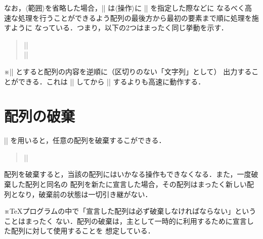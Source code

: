 \documentclass[a4paper,uplatex]{jsarticle}
\newcommand{\Meta}[1]{$\langle$\mbox{}#1\mbox{}$\rangle$}
\newcommand{\Note}{\par\noindent ※}
\newenvironment{syntax}{\begin{quote}\small}{\end{quote}}
\begin{document}
なお，\Meta{範囲}を省略した場合，|\EachArray| は\Meta{操作}に |\DeleteArray| を指定した際などに
なるべく高速な処理を行うことができるよう配列の最後方から最初の要素まで順に処理を施すように
なっている．つまり，以下の2つはまったく同じ挙動を示す．
%
\begin{syntax}
|| \\
||
\end{syntax}

\Note || とすると配列の内容を逆順に（区切りのない「文字列」として）
出力することができる．これは |\ReverseArray| してから |\toStringArray| するよりも高速に動作する．

\section{配列の破棄}

|\DestructArray| を用いると，任意の配列を破棄するこができる．
%
\begin{syntax}
|\DestructArray{|\Meta{配列名}|}|
\end{syntax}

配列を破棄すると，当該の配列にはいかなる操作もできなくなる．また，一度破棄した配列と同名の
配列を新たに宣言した場合，その配列はまったく新しい配列となり，破棄前の状態は一切引き継がない．

\Note \TeX プログラムの中で「宣言した配列は必ず破棄しなければならない」ということはまったく
ない．配列の破棄は，主として一時的に利用するために宣言した配列に対して使用することを
想定している．
\end{document}
